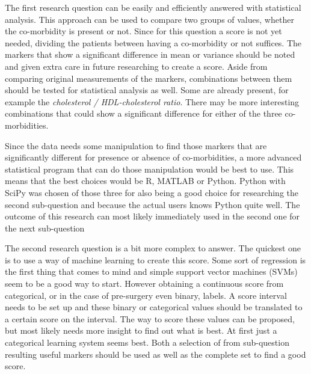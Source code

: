 \documentclass[10pt,a4paper]{report}
\begin{document}
	The first research question can be easily and efficiently answered with statistical analysis. This approach can be used to compare two groups of values, whether the co-morbidity is present or not. Since for this question a score is not yet needed, dividing the patients between having a co-morbidity or not suffices. The markers that show a significant difference in mean or variance should be noted and given extra care in future researching to create a score. Aside from comparing original measurements of the markers, combinations between them should be tested for statistical analysis as well. Some are already present, for example the \textit{cholesterol / HDL-cholesterol ratio}. There may be more interesting combinations that could show a significant difference for either of the three co-morbidities.
	
	Since the data needs some manipulation to find those markers that are significantly different for presence or absence of co-morbidities, a more advanced statistical program that can do those manipulation would be best to use. This means that the best choices would be R, MATLAB or Python. Python with SciPy was chosen of those three for also being a good choice for researching the second sub-question and because the actual users knows Python quite well. The outcome of this research can most likely immediately used in the second one for the next sub-question
	
	The second research question is a bit more complex to answer. The quickest one is to use a way of machine learning to create this score. Some sort of regression is the first thing that comes to mind and simple support vector machines (SVMs) seem to be a good way to start. However obtaining a continuous score from categorical, or in the case of pre-surgery even binary, labels. A score interval needs to be set up and these binary or categorical values should be translated to a certain score on the interval. The way to score these values can be proposed, but most likely needs more insight to find out what is best. At first just a categorical learning system seems best. Both a selection of from sub-question resulting useful markers should be used as well as the complete set to find a good score.
	
	
\end{document}
